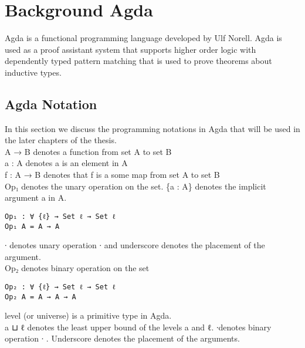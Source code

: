 \chapter{Background Agda}
Agda is a functional programming language developed by Ulf Norell. Agda is used as a proof assistant system that supports higher order logic with dependently typed pattern matching that is used to prove theorems about inductive types. 

\section{Agda Notation}
In this section we discuss the programming notations in Agda that will be used in the later chapters of the thesis.\\
A → B denotes a function from set A to set B\\
a : A denotes a is an element in A \\
f : A → B denotes that f is a some map from set A to set B\\
Op₁ denotes the unary operation on the set.
\{a : A\} denotes the implicit argument a in A. 
\begin{Verbatim}
Op₁ : ∀ {ℓ} → Set ℓ → Set ℓ
Op₁ A = A → A
\end{Verbatim}
\textunderscore ∙ denotes unary operation ∙ and underscore denotes the placement of the argument. \\
Op₂ denotes binary operation on the set
\begin{Verbatim}
Op₂ : ∀ {ℓ} → Set ℓ → Set ℓ
Op₂ A = A → A → A
\end{Verbatim}
level (or universe) is a primitive type in Agda. \\
a ⊔ ℓ denotes the least upper bound of the levels a and ℓ.
\textunderscore ∙\textunderscore  denotes binary operation ∙ . Underscore denotes the placement of the arguments.\\

